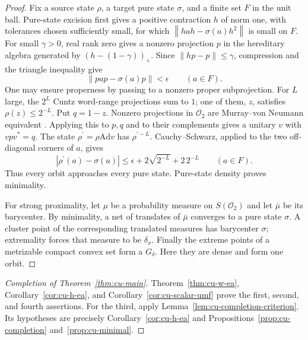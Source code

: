 \begin{proof}
Fix a source state $\rho$, a target pure state $\sigma$, and a finite set $F$
in the unit ball. Pure-state excision \cite[Proposition 2.2]{AkemannAndersonPedersen1986} first
gives a positive contraction $h$ of norm one, with tolerances chosen
sufficiently small, for which $\left\|hah-\sigma(a)h^2\right\|$ is small on $F$. For small $\gamma>0$, real rank zero \cite[Theorem 2.6(iii)]{BrownPedersen1991} gives a nonzero projection $p$ in the hereditary algebra
generated by $(h-(1-\gamma))_+$. Since $\left\|hp-p\right\|\leq\gamma$,
compression and the triangle inequality give 
\begin{equation*}
\left\|pap-\sigma(a)p\right\|<\epsilon\qquad(a\in F).
\end{equation*}
One may ensure properness by passing to a nonzero proper subprojection. For $L$ large, the $2^L$ Cuntz word-range projections sum to $1$; one of them, $z$, satisfies $\rho(z)\leq2^{-L}$. Put $q=1-z$. Nonzero projections in $\mathcal{O}_2$ are Murray--von Neumann equivalent \cite{Cuntz1981}. Applying
this to $p,q$ and to their complements gives a unitary $v$ with $vpv^*=q$.
The state $\rho^{\prime }=\rho\mathrm{Ad} v$ has $\rho^{\prime -L}$.
Cauchy--Schwarz, applied to the two off-diagonal corners of $a$, gives 
\begin{equation*}
\left|\rho^{\prime }(a)-\sigma(a)\right| \leq\epsilon+2\sqrt{2^{-L}}+2\,2^{-L}\qquad(a\in F).
\end{equation*}
Thus every orbit approaches every pure state. Pure-state density proves
minimality.

For strong proximality, let $\mu$ be a probability measure on $S(\mathcal{O}_2)$ and let $\bar\mu$ be its barycenter. By minimality, a net of translates
of $\bar\mu$ converges to a pure state $\sigma$. A cluster point of the
corresponding translated measures has barycenter $\sigma$; extremality
forces that measure to be $\delta_\sigma$. Finally the extreme points of a
metrizable compact convex set form a $G_\delta$. Here they are dense and
form one orbit.
\end{proof}

\begin{proof}[Completion of Theorem~\protect\ref{thm:cu-main}]
Theorem~\ref{thm:cu-w-ea}, Corollary~\ref{cor:cu-h-ea}, and Corollary~\ref{cor:cu-scalar-umf} prove the first, second, and fourth assertions. For the
third, apply Lemma~\ref{lem:cu-completion-criterion}. Its hypotheses are
precisely Corollary~\ref{cor:cu-h-ea} and Propositions~\ref{prop:cu-completion}
and~\ref{prop:cu-minimal}.
\end{proof}

